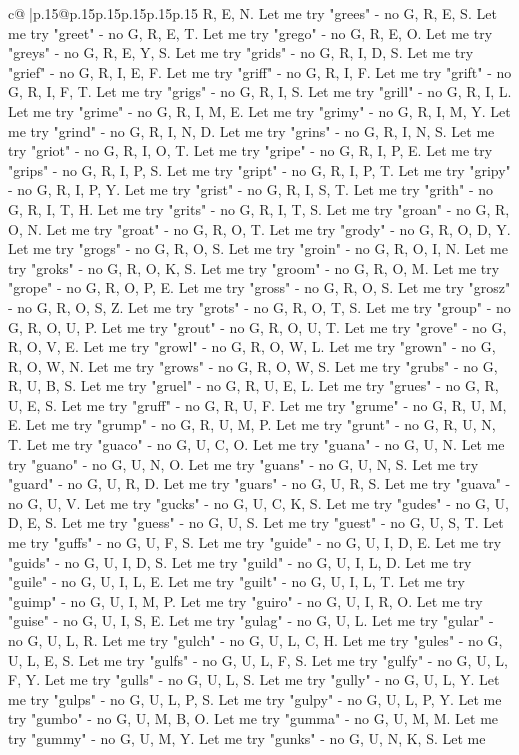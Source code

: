 \documentclass{article}
\begin{document}
{\begin{supertabular}{c@{$\;$}|p{.15\linewidth}@{}p{.15\linewidth}p{.15\linewidth}p{.15\linewidth}p{.15\linewidth}p{.15\linewidth}}
{{{R, E, N. Let me try "grees" {-} no G, R, E, S. Let me try "greet" {-} no G, R, E, T. Let me try "grego" {-} no G, R, E, O. Let me try "greys" {-} no G, R, E, Y, S. Let me try "grids" {-} no G, R, I, D, S. Let me try "grief" {-} no G, R, I, E, F. Let me try "griff" {-} no G, R, I, F. Let me try "grift" {-} no G, R, I, F, T. Let me try "grigs" {-} no G, R, I, S. Let me try "grill" {-} no G, R, I, L. Let me try "grime" {-} no G, R, I, M, E. Let me try "grimy" {-} no G, R, I, M, Y. Let me try "grind" {-} no G, R, I, N, D. Let me try "grins" {-} no G, R, I, N, S. Let me try "griot" {-} no G, R, I, O, T. Let me try "gripe" {-} no G, R, I, P, E. Let me try "grips" {-} no G, R, I, P, S. Let me try "gript" {-} no G, R, I, P, T. Let me try "gripy" {-} no G, R, I, P, Y. Let me try "grist" {-} no G, R, I, S, T. Let me try "grith" {-} no G, R, I, T, H. Let me try "grits" {-} no G, R, I, T, S. Let me try "groan" {-} no G, R, O, N. Let me try "groat" {-} no G, R, O, T. Let me try "grody" {-} no G, R, O, D, Y. Let me try "grogs" {-} no G, R, O, S. Let me try "groin" {-} no G, R, O, I, N. Let me try "groks" {-} no G, R, O, K, S. Let me try "groom" {-} no G, R, O, M. Let me try "grope" {-} no G, R, O, P, E. Let me try "gross" {-} no G, R, O, S. Let me try "grosz" {-} no G, R, O, S, Z. Let me try "grots" {-} no G, R, O, T, S. Let me try "group" {-} no G, R, O, U, P. Let me try "grout" {-} no G, R, O, U, T. Let me try "grove" {-} no G, R, O, V, E. Let me try "growl" {-} no G, R, O, W, L. Let me try "grown" {-} no G, R, O, W, N. Let me try "grows" {-} no G, R, O, W, S. Let me try "grubs" {-} no G, R, U, B, S. Let me try "gruel" {-} no G, R, U, E, L. Let me try "grues" {-} no G, R, U, E, S. Let me try "gruff" {-} no G, R, U, F. Let me try "grume" {-} no G, R, U, M, E. Let me try "grump" {-} no G, R, U, M, P. Let me try "grunt" {-} no G, R, U, N, T. Let me try "guaco" {-} no G, U, C, O. Let me try "guana" {-} no G, U, N. Let me try "guano" {-} no G, U, N, O. Let me try "guans" {-} no G, U, N, S. Let me try "guard" {-} no G, U, R, D. Let me try "guars" {-} no G, U, R, S. Let me try "guava" {-} no G, U, V. Let me try "gucks" {-} no G, U, C, K, S. Let me try "gudes" {-} no G, U, D, E, S. Let me try "guess" {-} no G, U, S. Let me try "guest" {-} no G, U, S, T. Let me try "guffs" {-} no G, U, F, S. Let me try "guide" {-} no G, U, I, D, E. Let me try "guids" {-} no G, U, I, D, S. Let me try "guild" {-} no G, U, I, L, D. Let me try "guile" {-} no G, U, I, L, E. Let me try "guilt" {-} no G, U, I, L, T. Let me try "guimp" {-} no G, U, I, M, P. Let me try "guiro" {-} no G, U, I, R, O. Let me try "guise" {-} no G, U, I, S, E. Let me try "gulag" {-} no G, U, L. Let me try "gular" {-} no G, U, L, R. Let me try "gulch" {-} no G, U, L, C, H. Let me try "gules" {-} no G, U, L, E, S. Let me try "gulfs" {-} no G, U, L, F, S. Let me try "gulfy" {-} no G, U, L, F, Y. Let me try "gulls" {-} no G, U, L, S. Let me try "gully" {-} no G, U, L, Y. Let me try "gulps" {-} no G, U, L, P, S. Let me try "gulpy" {-} no G, U, L, P, Y. Let me try "gumbo" {-} no G, U, M, B, O. Let me try "gumma" {-} no G, U, M, M. Let me try "gummy" {-} no G, U, M, Y. Let me try "gunks" {-} no G, U, N, K, S. Let me }}}
\end{supertabular}}
\end{document}
